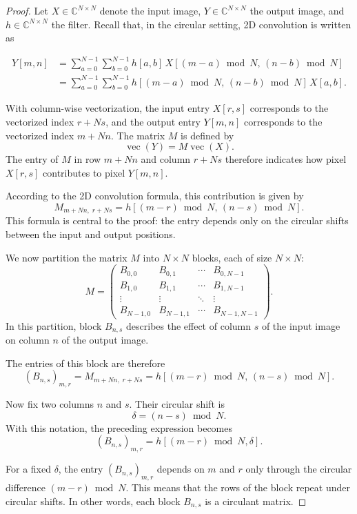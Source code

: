 \begin{proof}

Let $X\in\mathbb{C}^{N\times N}$ denote the input image, $Y\in\mathbb{C}^{N\times N}$ the output
image, and $h\in\mathbb{C}^{N\times N}$ the filter. Recall that, in the circular setting, 2D convolution is written as

$$\begin{aligned}
    Y[m,n] &= \sum_{a=0}^{N-1} \sum_{b=0}^{N-1} h[a,b] \, X[(m-a)\bmod N, \, (n-b)\bmod N] \\
           &= \sum_{a=0}^{N-1} \sum_{b=0}^{N-1} h[(m-a)\bmod N, \, (n-b)\bmod N] \, X[a, b].
\end{aligned}$$

With column-wise vectorization, the input entry $X[r,s]$ corresponds to the vectorized index
$r+Ns$, and the output entry $Y[m,n]$ corresponds to the vectorized index $m+Nn$. The matrix $M$ is defined
by
\[
    \operatorname{vec}(Y)=M\operatorname{vec}(X).
\]
The entry of $M$ in row $m+Nn$ and column $r+Ns$ therefore indicates how pixel
$X[r,s]$ contributes to pixel $Y[m,n]$.

According to the 2D convolution formula, this contribution is given by
\[
    M_{m+Nn,\;r+Ns}
    =
    h[(m-r)\bmod N,\,(n-s)\bmod N].
\]
This formula is central to the proof: the entry depends only on the circular
shifts between the input and output positions.

We now partition the matrix $M$ into $N\times N$ blocks, each of size $N\times N$:
\[
M =
\begin{pmatrix}
B_{0,0} & B_{0,1} & \cdots & B_{0,N-1} \\
B_{1,0} & B_{1,1} & \cdots & B_{1,N-1} \\
\vdots  & \vdots  & \ddots & \vdots \\
B_{N-1,0} & B_{N-1,1} & \cdots & B_{N-1,N-1}
\end{pmatrix}.
\]
In this partition, block $B_{n,s}$ describes the effect of column $s$ of the input image on
column $n$ of the output image.

The entries of this block are therefore
\[
    (B_{n,s})_{m,r}
    =
    M_{m+Nn,\;r+Ns}
    =
    h[(m-r)\bmod N,\,(n-s)\bmod N].
\]

Now fix two columns $n$ and $s$. Their circular shift is
\[
    \delta = (n-s)\bmod N.
\]
With this notation, the preceding expression becomes
\[
    (B_{n,s})_{m,r}
    =
    h[(m-r)\bmod N,\delta].
\]

For a fixed $\delta$, the entry $(B_{n,s})_{m,r}$ depends on $m$ and $r$ only through
the circular difference $(m-r)\bmod N$. This means that the rows of the block repeat under
circular shifts. In other words, each block $B_{n,s}$ is a circulant matrix.


\end{proof}

